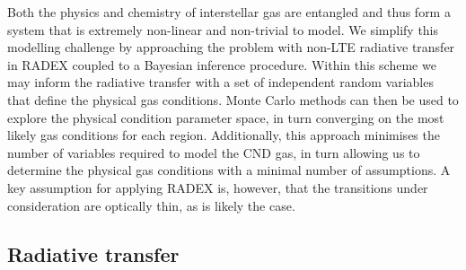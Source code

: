 \documentclass[twocolumn]{aastex631}
\begin{document}
Both the physics and chemistry of interstellar gas are entangled and thus form a system that is extremely non-linear and non-trivial to model. We simplify this modelling challenge by approaching the problem with non-LTE radiative transfer in RADEX \citep{radex} coupled to a Bayesian inference procedure. Within this scheme we may inform the radiative transfer with a set of independent random variables that define the physical gas conditions. Monte Carlo methods can then be used to explore the physical condition parameter space, in turn converging on the most likely gas conditions for each region. Additionally, this approach minimises the number of variables required to model the CND gas, in turn allowing us to determine the physical gas conditions with a minimal number of assumptions. A key assumption for applying RADEX is, however, that the transitions under consideration are optically thin, as is likely the case.


\subsection{Radiative transfer} \label{sec:radiative-transfer}
\end{document}
